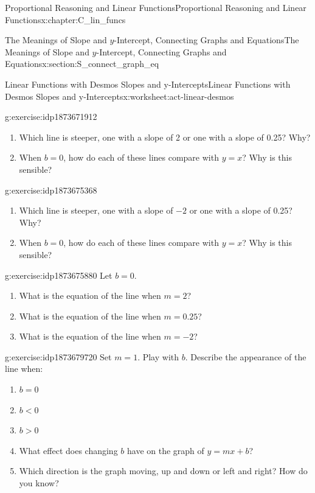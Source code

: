 \documentclass[oneside,10pt,]{book}
\numberwithin{equation}{chapter}
\newcommand{\lt}{<}
\newcommand{\gt}{>}
\begin{document}
\begin{chapterptx}{Proportional Reasoning and Linear Functions}{}{Proportional Reasoning and Linear Functions}{}{}{x:chapter:C_lin_funcs}
\begin{sectionptx}{The Meanings of Slope and \(y\)-Intercept, Connecting Graphs and Equations}{}{The Meanings of Slope and \(y\)-Intercept, Connecting Graphs and Equations}{}{}{x:section:S_connect_graph_eq}
\begin{worksheet-subsection}{Linear Functions with Desmos \textemdash{} Slopes and y-Intercepts}{}{Linear Functions with Desmos \textemdash{} Slopes and y-Intercepts}{}{}{x:worksheet:act-linear-desmos}
\begin{divisionexercise}{4}{}{}{g:exercise:idp1873671912}%
\begin{enumerate}[font=\bfseries,label=(\alph*),ref=\alph*]
\item{}Which line is steeper, one with a slope of 2 or one with a slope of 0.25? Why?%
\item{}When \(b = 0\), how do each of these lines compare with \(y = x\)? Why is this sensible?%
\end{enumerate}
\end{divisionexercise}%
\begin{divisionexercise}{5}{}{}{g:exercise:idp1873675368}%
\begin{enumerate}[font=\bfseries,label=(\alph*),ref=\alph*]
\item{}Which line is steeper, one with a slope of \(-2\) or one with a slope of 0.25? Why?%
\item{}When \(b = 0\), how do each of these lines compare with \(y = x\)? Why is this sensible?%
\end{enumerate}
\end{divisionexercise}%
\begin{divisionexercise}{6}{}{}{g:exercise:idp1873675880}%
Let \(b = 0\).%
\begin{enumerate}[font=\bfseries,label=(\alph*),ref=\alph*]
\item{}What is the equation of the line when \(m = 2\)?%
\item{}What is the equation of the line when \(m = 0.25\)?%
\item{}What is the equation of the line when \(m = -2\)?%
\end{enumerate}
\end{divisionexercise}%
\begin{divisionexercise}{7}{}{}{g:exercise:idp1873679720}%
Set \(m = 1\). Play with \(b\). Describe the appearance of the line when:%
\begin{enumerate}[font=\bfseries,label=(\alph*),ref=\alph*]
\item{}\(b = 0\)%
\item{}\(b \lt 0\)%
\item{}\(b \gt 0\)%
\item{}What effect does changing \(b\) have on the graph of \(y = mx + b\)?%
\item{}Which direction is the graph moving, up and down or left and right? How do you know?%
\end{enumerate}
\end{divisionexercise}%

\end{worksheet-subsection}
\end{sectionptx}
\end{chapterptx}
\end{document}
